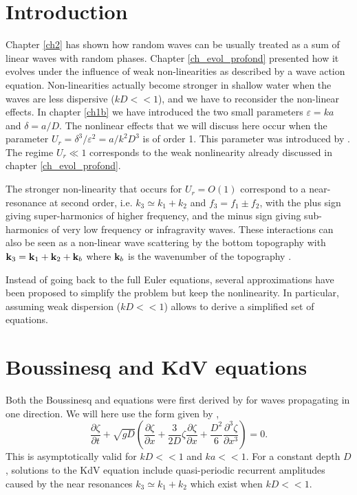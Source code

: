 \section{Introduction}
Chapter \ref{ch2} has shown how random waves can be usually treated as a 
sum of linear waves with random phases. Chapter \ref{ch_evol_profond} presented how it evolves under the influence of weak non-linearities 
as described by a wave action equation. Non-linearities actually become stronger in shallow water when the waves are less dispersive ($kD << 1$), 
and we have to reconsider the non-linear effects. In chapter \ref{ch1b} we have introduced the two small parameters 
$\varepsilon=ka$ and $\delta=a/D$. The nonlinear effects that we will discuss here occur when the parameter $U_r = \delta^3/\varepsilon^2= a/k^2 D^3$ is 
of order 1. This parameter was introduced by \cite{Ursell1953}. The regime $U_r  \ll 1$ corresponds to the weak nonlinearity already 
discussed in chapter  \ref{ch_evol_profond}. 

The stronger non-linearity that occurs for $U_r=O(1)$ correspond to a near-resonance at second order, i.e. $k_3 \simeq k_1 + k_2$ and 
 $f_3 = f_1 \pm f_2$, with the plus sign giving super-harmonics of higher frequency, and the minus sign giving sub-harmonics of very low frequency 
 or infragravity waves. These interactions can also be seen as a non-linear wave scattering by the bottom topography with $\mathbf{k}_3 =  \mathbf{k}_1 + \mathbf{k}_2 + \mathbf{k}_b$ 
 where $\mathbf{k}_b$ is the wavenumber of the topography \citep{Liu&Yue1998,Groeneweg&al.2015}. 

Instead of going back to the full Euler equations, several approximations have been proposed to simplify the problem but keep the nonlinearity. 
In  particular, assuming weak dispersion ($kD << 1$) allows to derive a simplified set of equations. 

\section{Boussinesq and KdV equations}
Both the Boussinesq and \citet[][KdV for short]{Korteweg&deVries1895} equations were first derived by \cite{Boussinesq1872} for waves propagating in one direction. We will 
here use the form given by \cite{Peregrine1967}, 
\begin{equation}
    \frac{\partial \zeta}{\partial t}+\sqrt{gD} \left( \frac{\partial \zeta}{\partial x}+\frac{3}{2D} \zeta \frac{\partial \zeta}{\partial x}
    +\frac{D^2}{6} \frac{\partial^3 \zeta}{\partial x^3} \right)=0. \label{eq:KdV}
\end{equation}
This is asymptotically valid for $kD << 1$ and $ka << 1$. For a constant depth $D$, 
solutions to the KdV equation include quasi-periodic recurrent amplitudes 
\citep{Fermi&al.1955} caused by the near resonances $k_3 \simeq k_1 + k_2$  which exist when $kD<< 1$. 

